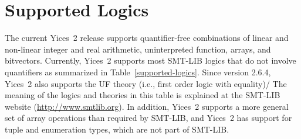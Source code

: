 \documentclass[11pt,twoside,fleqn,openright,titlepage]{cslreport}
\begin{document}
\section{Supported Logics}

The current Yices~2 release supports quantifier-free combinations of
linear and non-linear integer and real arithmetic, uninterpreted
function, arrays, and bitvectors. Currently, Yices~2 supports most
SMT-LIB logics that do not involve quantifiers as summarized in
Table~\ref{supported-logics}.  Since version 2.6.4, Yices~2 also
supports the UF theory (i.e., first order logic with equality)/ The
meaning of the logics and theories in this table is explained at the
SMT-LIB website (\url{http://www.smtlib.org}).  In addition, Yices~2
supports a more general set of array operations than required by
SMT-LIB, and Yices~2 has support for tuple and enumeration types,
which are not part of SMT-LIB.


\newcommand{\desc}[1]{\parbox[c][1.6em][c]{9cm}{{\footnotesize #1}}}
\newcommand{\ddesc}[1]{\parbox[c][2.6em]{9cm}{{\footnotesize #1}}}
\end{document}
